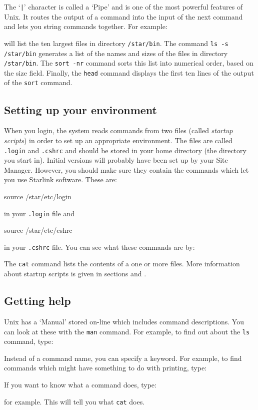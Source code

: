 \documentclass[twoside,11pt,nolof]{starlink}
\begin{document}
The `\texttt{|}' character is called a `Pipe' and is one of the most powerful
features of Unix.
It routes the output of a command into the input of the next command and lets
you string commands together.
For example:
\begin{terminalv}
\end{terminalv}
will list the ten largest files in directory \texttt{/star/bin}.
The command \texttt{ls -s /star/bin} generates a list of the names and sizes of the
files in directory \texttt{/star/bin}.
The \texttt{sort -nr} command sorts this list into numerical order, based on
the size field.
Finally, the \texttt{head} command displays the first ten lines of the output of
the \texttt{sort} command.

\subsection{Setting up your environment\label{suye}}

When you login, the system reads commands from two files (called \emph{startup
scripts}) in order to set up an appropriate environment.
The files are called \texttt{.login} and \texttt{.cshrc} and should be stored in your
home directory (the directory you start in).
Initial versions will probably have been set up by your Site Manager.
However, you should make sure they contain the commands which let you use
Starlink software.
These are:
\begin{terminalv}
source /star/etc/login
\end{terminalv}
in your \texttt{.login} file and
\begin{terminalv}
source /star/etc/cshrc
\end{terminalv}
in your \texttt{.cshrc} file.
You can see what these commands are by:
\begin{terminalv}
\end{terminalv}
The \texttt{cat} command lists the contents of a one or more files.
More information about startup scripts is given in sections
 and
.

\subsection{Getting help}

Unix has a `Manual' stored on-line which includes command descriptions.
You can look at these with the \texttt{man} command.
For example, to find out about the \texttt{ls} command, type:
\begin{terminalv}
\end{terminalv}
Instead of a command name, you can specify a keyword.
For example, to find commands which might have something to do with printing,
type:
\begin{terminalv}
\end{terminalv}
If you want to know what a command does, type:
\begin{terminalv}
\end{terminalv}
for example.
This will tell you what \texttt{cat} does.
\end{document}
